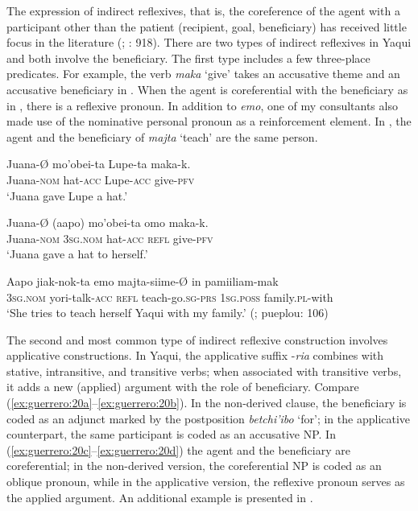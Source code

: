 \documentclass[output=paper]{langscibook}
\begin{document}
The expression of indirect reflexives, that is, the coreference of the agent with a participant other than the patient (recipient, goal, beneficiary) has received little focus in the literature (\citealt{Kemmer1993}; \citealt{Kazenin2001}: 918). There are two types of indirect reflexives in Yaqui and both involve the beneficiary. The first type includes a few three-place predicates. For example, the verb \textit{maka} ‘give’ takes an accusative theme and an accusative beneficiary in . When the agent is coreferential with the beneficiary as in , there is a reflexive pronoun. In addition to \textit{emo}, one of my consultants also made use of the nominative personal pronoun as a reinforcement element. In , the agent and the beneficiary of \textit{majta} ‘teach’ are the same person.



\ea%
    \label{ex:guerrero:19}

\ea
\label{ex:guerrero:19a}
\gll Juana-Ø  mo’obei-ta   Lupe-ta   maka-k.\\
    Juana-\textsc{nom}  hat\textsc{-acc} Lupe\textsc{{}-acc}  give-\textsc{pfv}\\
\glt ‘Juana gave Lupe a hat.’
 
 \ex
 \label{ex:guerrero:19b}
\gll Juana-Ø  (aapo)   mo’obei-ta  omo   maka-k.\\
    Juana-\textsc{nom}  \textsc{3sg.nom}  hat\textsc{{}-acc}    \textsc{refl}  give-\textsc{pfv}\\
\glt ‘Juana gave a hat to herself.’

\ex
\label{ex:guerrero:19c}
\gll Aapo     jiak-nok-ta   emo   majta-siime-Ø  in   pamiiliam-mak\\
    \textsc{3sg.nom}  yori-talk-\textsc{acc}  \textsc{refl}   teach-go.\textsc{sg-prs}  \textsc{1sg.poss}  family.\textsc{pl}{}-with\\
\glt ‘She tries to teach herself Yaqui with my family.’ (\citealt{Buitimea2007}; pueplou: 106)
\z
\z



The second and most common type of indirect reflexive construction involves applicative constructions. In Yaqui, the applicative suffix -\textit{ria} combines with stative, intransitive, and transitive verbs; when associated with transitive verbs, it adds a new (applied) argument with the role of beneficiary. Compare (\ref{ex:guerrero:20a}--\ref{ex:guerrero:20b}). In the non-derived clause, the beneficiary is coded as an adjunct marked by the postposition \textit{betchi’ibo} ‘for’; in the applicative counterpart, the same participant is coded as an accusative NP. In (\ref{ex:guerrero:20c}--\ref{ex:guerrero:20d}) the agent and the beneficiary are coreferential; in the non-derived version, the coreferential NP is coded as an oblique pronoun, while in the applicative version, the reflexive pronoun serves as the applied argument. An additional example is presented in .
\end{document}
